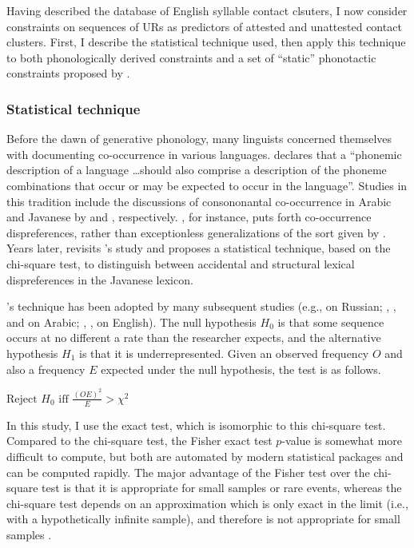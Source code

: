 
Having described the database of English syllable contact clsuters, I now consider constraints on sequences of URs as predictors of attested and unattested contact clusters. First, I describe the statistical technique used, then apply this technique to both phonologically derived constraints and a set of ``static'' phonotactic constraints proposed by \citet{Pierrehumbert1994}. 

\subsubsection{Statistical technique}

Before the dawn of generative phonology, many linguists concerned themselves with documenting co-occurrence in various languages. \citet[][28]{Vogt1954} declares that a ``phonemic description of a language \ldots should also comprise a description of the phoneme combinations that occur or may be expected to occur in the language''. Studies in this tradition include the discussions of consononantal co-occurrence in Arabic and Javanese by \citet{Greenberg1950} and \citet{Uhlenbeck1950}, respectively. \citeauthor{Uhlenbeck1950}, for instance, puts forth co-occurrence dispreferences, rather than exceptionless generalizations of the sort given by \citet{Greenberg1950}. Years later, \citet{Mester1988} revisits \citeauthor{Uhlenbeck1950}'s study and proposes a statistical technique, based on the chi-square test, to distinguish between accidental and structural lexical dispreferences in the Javanese lexicon. 

\citeauthor{Mester1988}'s technique has been adopted by many subsequent studies (e.g., \citealt{Padgett1992,Padgett1995} on Russian; \citealt{Pierrehumbert1993}, \citealt{Frisch1996}, and \citealt{Frisch2004} on Arabic; \citealt{Berkley1994b,Berkley1994a,Berkley2000}, \citealt{Dmitrieva2008a}, \citealt{Dmitrieva2008b} on English). The null hypothesis $H_0$ is that some sequence occurs at no different a rate than the researcher expects, and the alternative hypothesis $H_1$ is that it is underrepresented. Given an observed frequency $O$ and also a frequency $E$ expected under the null hypothesis, the test is as follows.

\ex $\displaystyle \textrm{Reject } H_0 \textrm{ iff } \frac{(O E) ^ 2}{E} >
\chi^2$ \xe

  
In this study, I use the \citet{Fisher1934} exact test, which is isomorphic to this chi-square test. Compared to the chi-square test, the Fisher exact test $p$-value is somewhat more difficult to compute, but both are automated by modern statistical packages and can be computed rapidly. The major advantage of the Fisher test over the chi-square test is that it is appropriate for small samples or rare events, whereas the chi-square test depends on an approximation which is only exact in the limit (i.e., with a hypothetically infinite sample), and therefore is not appropriate for small samples \citep[see][]{Gorman2012a}.

